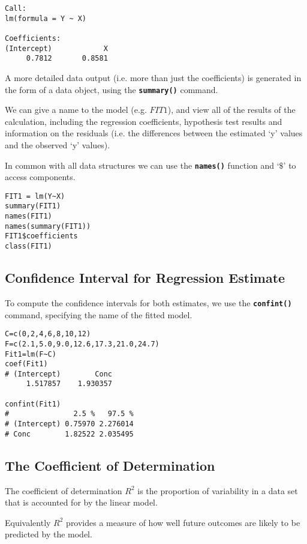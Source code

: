 \documentclass[a4paper,12pt]{article}
\begin{document}
\begin{verbatim}
Call:
lm(formula = Y ~ X)

Coefficients:
(Intercept)            X
     0.7812       0.8581
\end{verbatim}

A more detailed data output (i.e. more than just the coefficients) is generated in the form of a data object, using the \textbf{\texttt{summary()}} command.

We can give a name to the model (e.g. $FIT1$), and view all of the results of the calculation, including the regression coefficients, hypothesis test results and information on the residuals (i.e. the differences between the estimated ‘y’ values and the observed ‘y’ values).

In common with all data structures we can use the \textbf{\texttt{names()}} function and ‘$\$$’ to access components.

\begin{framed}
\begin{verbatim}
FIT1 = lm(Y~X)
summary(FIT1)
names(FIT1)
names(summary(FIT1))
FIT1$coefficients
class(FIT1)
\end{verbatim}
\end{framed}
\newpage
\subsection{Confidence Interval for Regression Estimate}
To compute the confidence intervals for both estimates, we use the \texttt\textbf{{confint()}} command, specifying the name of the fitted model.
\begin{framed}
\begin{verbatim}
C=c(0,2,4,6,8,10,12)
F=c(2.1,5.0,9.0,12.6,17.3,21.0,24.7)
Fit1=lm(F~C)
coef(Fit1)
# (Intercept)        Conc
     1.517857    1.930357

confint(Fit1)
#               2.5 %   97.5 %
# (Intercept) 0.75970 2.276014
# Conc        1.82522 2.035495
\end{verbatim}
\end{framed}

\subsection{The Coefficient of Determination}
The coefficient of determination $R^2$ is the proportion of variability in a data set that is accounted for by the linear model.

Equivalently $R^2$ provides a measure of how well future outcomes are likely to be predicted by the model.
\end{document}
